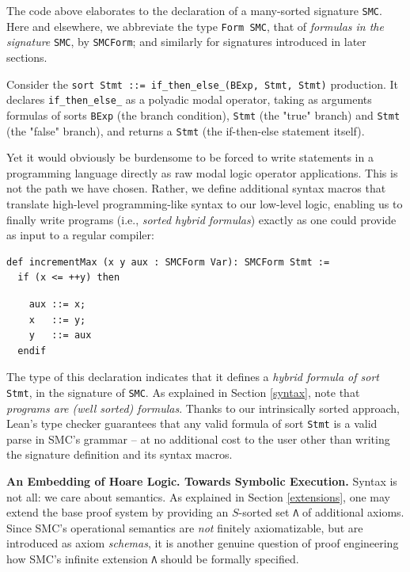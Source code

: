 \documentclass{easychair}
\theoremstyle{remark}
\begin{document}
The code above elaborates to the declaration of a many-sorted signature \lstinline{SMC}. Here and elsewhere, we abbreviate the type \lstinline{Form SMC}, that of \textit{formulas in the signature} \lstinline{SMC}, by \lstinline{SMCForm}; and similarly for signatures introduced in later sections.

Consider the \lstinline{sort Stmt ::= if_then_else_(BExp, Stmt, Stmt)} production. It declares \lstinline{if_then_else_} as a polyadic modal operator, taking as arguments formulas of sorts \lstinline|BExp| (the branch condition), \lstinline|Stmt| (the "true" branch) and \lstinline|Stmt| (the "false" branch), and returns a \lstinline|Stmt| (the if-then-else statement itself).

Yet it would obviously be burdensome to be forced to write statements in a programming language directly as raw modal logic operator applications. This is not the path we have chosen. Rather, we define additional syntax macros that translate high-level programming-like syntax to our low-level logic, enabling us to finally write programs (i.e., \textit{sorted hybrid formulas}) exactly as one could provide as input to a regular compiler:

\begin{lstlisting}
def incrementMax (x y aux : SMCForm Var): SMCForm Stmt :=
  if (x <= ++y) then
\end{lstlisting}
\vspace{-1.25em}
\begin{lstlisting}
    aux ::= x;
    x   ::= y;
    y   ::= aux
  endif
\end{lstlisting}

The type of this declaration indicates that it defines a \textit{hybrid formula of sort} \lstinline|Stmt|, in the signature of \lstinline|SMC|. As explained in Section \ref{syntax}, note that \textit{programs are (well sorted) formulas}. Thanks to our intrinsically sorted approach, Lean's type checker guarantees that any valid formula of sort \lstinline{Stmt} is a valid parse in SMC's grammar -- at no additional cost to the user other than writing the signature definition and its syntax macros.

{\bf An Embedding of Hoare Logic. Towards Symbolic Execution.} Syntax is not all: we care about semantics. As explained in Section \ref{extensions}, one may extend the base proof system by providing an $S$-sorted set \lstinline|Λ| of additional axioms. Since SMC's operational semantics are \textit{not} finitely axiomatizable, but are introduced as axiom \textit{schemas}, it is another genuine question of proof engineering how SMC's infinite extension \lstinline|Λ| should be formally specified.
\end{document}
